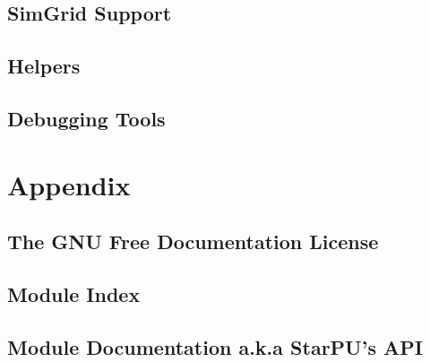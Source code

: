 \chapter{SimGrid Support}
\label{SimGridSupport}
\hypertarget{SimGridSupport}{}


\chapter{Helpers}
\label{Helpers}
\hypertarget{Helpers}{}


\chapter{Debugging Tools}
\label{DebuggingTools}
\hypertarget{DebuggingTools}{}


\part{Appendix}

\chapter{The GNU Free Documentation License}
\label{GNUFreeDocumentationLicense}
\hypertarget{GNUFreeDocumentationLicense}{}


\chapter{Module Index}


\chapter{Module Documentation a.k.a StarPU's API}
\label{ModuleDocumentation}
\hypertarget{ModuleDocumentation}{}

